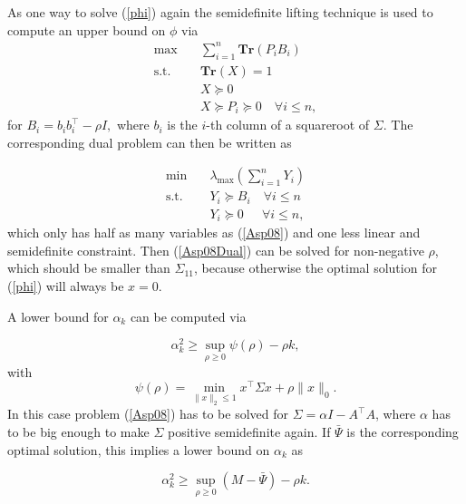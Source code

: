 \documentclass[a4paper,11pt,1p]{elsarticle}
\newcommand{\Norm}[2]{\lVert{#1}\rVert_{#2}}
\newcommand{\T}{^{\top}}
\newcommand{\Tr}{\textbf{Tr}}
\begin{document}
As one way to solve (\ref{phi}) again the semidefinite lifting technique is used to compute an upper bound on $\phi$ via
\begin{align}\label{Asp08}
 \max \quad & \sum_{i=1}^n\Tr(P_iB_i) \nonumber \\
 \text{s.t.} \quad & \Tr(X) = 1 \nonumber \\
 & X \succeq 0 \tag{A2-Primal} \\
 & X \succeq P_i \succeq 0 \quad \forall i \leq n, \nonumber
\end{align}
for $B_i = b_ib_i\T - \rho I,$ where $b_i$ is the $i$-th column of a squareroot of $\Sigma$. The corresponding dual problem can then be written as 
 
\begin{align}\label{Asp08Dual}
  \min \quad & \lambda_{\max}\left(\sum_{i=1}^n Y_i \right) \nonumber \\
  \text{s.t.} \quad & Y_i \succeq B_i \quad \forall i \leq n \tag{A2-Dual} \\
  & Y_i \succeq 0 \quad \ \ \forall i \leq n, \nonumber
\end{align}
which only has half as many variables as (\ref{Asp08}) and one less linear and semidefinite constraint. Then (\ref{Asp08Dual}) can be solved for non-negative $\rho$, which should be smaller than $\Sigma_{11}$, because otherwise the
optimal solution for (\ref{phi}) will always be $x=0$. 

A lower bound for $\alpha_k$ can be computed via

\begin{equation*}
 \alpha_k^2 \geq \sup_{\rho \geq 0} \psi(\rho) - \rho k,
\end{equation*}
with 
\begin{equation*}
 \psi(\rho) = \min_{\Norm{x}{2} \leq 1} x\T \Sigma x + \rho \Norm{x}{0}.
\end{equation*}
In this case problem (\ref{Asp08}) has to be solved for $\Sigma = \alpha I - A\T A$, where $\alpha$ has to be big enough to make $\Sigma$ positive semidefinite again. If $\bar{\Psi}$ is the corresponding optimal solution, this implies
a lower bound on $\alpha_k$ as

\begin{equation*}
 \alpha_k^2 \geq \sup_{\rho \geq 0} (M - \bar{\Psi}) - \rho k.
\end{equation*}
\end{document}
